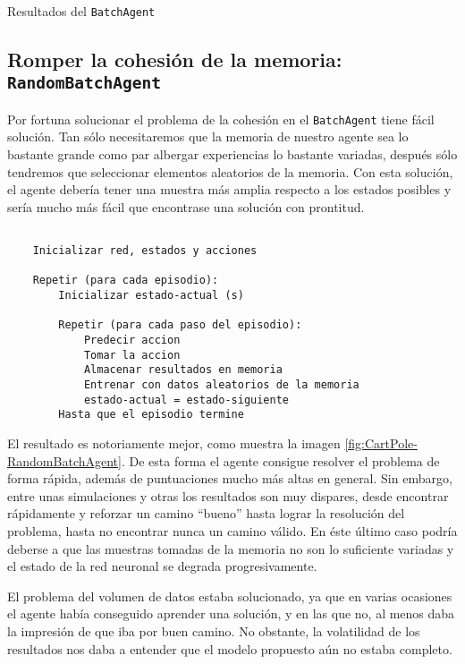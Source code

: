 %
       {Resultados del \texttt{BatchAgent}}


\subsection{Romper la cohesión de la memoria: \texttt{RandomBatchAgent}}
\label{sec:cartpoledqn3}

Por fortuna solucionar el problema de la cohesión en el \texttt{BatchAgent} tiene fácil solución. Tan sólo necesitaremos que la memoria de nuestro agente sea lo bastante grande como par albergar experiencias lo bastante variadas, después sólo tendremos que seleccionar elementos aleatorios de la memoria. Con esta solución, el agente debería tener una muestra más amplia respecto a los estados posibles y sería mucho más fácil que encontrase una solución con prontitud.

\begin{minipage}{0.9\linewidth}%
    \begin{lstlisting}[frame=tb, caption=Pseudocódigo RandomBatchAgent, inputencoding=latin1, label=code:cartpole_drl3]
    
    Inicializar red, estados y acciones
    
    Repetir (para cada episodio):
        Inicializar estado-actual (s)
        
        Repetir (para cada paso del episodio):
            Predecir accion
            Tomar la accion
            Almacenar resultados en memoria
            Entrenar con datos aleatorios de la memoria
            estado-actual = estado-siguiente
        Hasta que el episodio termine
    \end{lstlisting}%
\end{minipage}

El resultado es notoriamente mejor, como muestra la imagen \ref{fig:CartPole-RandomBatchAgent}. De esta forma el agente consigue resolver el problema de forma rápida, además de puntuaciones mucho más altas en general. Sin embargo, entre unas simulaciones y otras los resultados son muy dispares, desde encontrar rápidamente y reforzar un camino ``bueno'' hasta lograr la resolución del problema, hasta no encontrar nunca un camino válido. En éste último caso podría deberse a que las muestras tomadas de la memoria no son lo suficiente variadas y el estado de la red neuronal se degrada progresivamente.

El problema del volumen de datos estaba solucionado, ya que en varias ocasiones el agente había conseguido aprender una solución, y en las que no, al menos daba la impresión de que iba por buen camino. No obstante, la volatilidad de los resultados nos daba a entender que el modelo propuesto aún no estaba completo.

